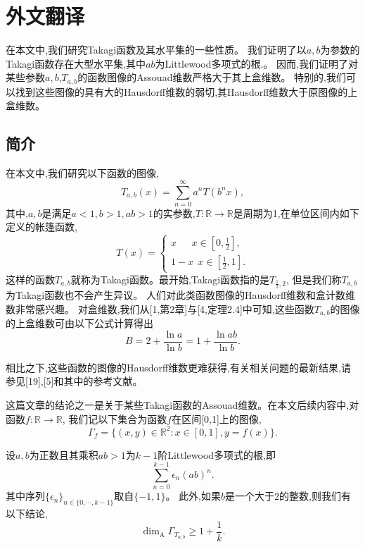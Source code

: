 \cleardoublepage

\newrefsection


\newtheorem{remark}[theorem]{评注}

\newtheorem{question}[theorem]{问题}

\newtheorem{theoremno}{定理}
\newcommand{\Hdim}{\mathrm{\dim_H}}
\newcommand{\Adim}{\mathrm{\dim_A}}
\newcommand{\Bdim}{\mathrm{\dim_B}}
\newcommand{\diam}{\mathrm{diam}}
\newcommand{\Hd}{\mathrm{d}_\mathcal{H}}
\chapter{外文翻译}


在本文中,我们研究Takagi函数及其水平集的一些性质。
我们证明了以$a,b$为参数的Takagi函数存在大型水平集,其中$ab$为Littlewood多项式的根.。
因而,我们证明了对某些参数$a,b$,$T_{a,b}$的函数图像的Assouad维数严格大于其上盒维数。
特别的,我们可以找到这些图像的具有大的Hausdorff维数的弱切,其Hausdorff维数大于原图像的上盒维数。

\section{简介}
在本文中,我们研究以下函数的图像,
$$
T_{a,b}(x)=\sum_{n=0}^\infty a^nT(b^nx),
$$
其中,$a,b$是满足$a<1,b>1,ab>1$的实参数,$T:\mathbb{R}\rightarrow\mathbb{R}$是周期为1,在单位区间内如下定义的帐篷函数,
$$
T(x)=\begin{cases}x~~~~~~~x\in[0,\frac{1}{2}], \\ 1-x~~x\in[\frac{1}{2},1].\end{cases}
$$
这样的函数$T_{a,b}$就称为Takagi函数。最开始,Takagi函数指的是$T_{\frac{1}{2},2}$,
但是我们称$T_{a,b}$为Takagi函数也不会产生异议。
人们对此类函数图像的Hausdorff维数和盒计数维数非常感兴趣。
对盒维数,我们从[1,第2章]与[4,定理2.4]中可知,这些函数$T_{a,b}$的图像的上盒维数可由以下公式计算得出
$$
B = 2 + \frac{\ln a}{\ln b} = 1 + \frac{\ln ab}{\ln b}.
$$

相比之下,这些函数的图像的Hausdorff维数更难获得,有关相关问题的最新结果,请参见[19],[5]和其中的参考文献。

这篇文章的结论之一是关于某些Takagi函数的Assouad维数。在本文后续内容中,对函数$f:\mathbb{R}\rightarrow\mathbb{R}$,
我们记以下集合为函数$f$在区间[0,1]上的图像,
$$
\Gamma_f=\{(x,y)\in\mathbb{R}^2:x\in[0,1],y=f(x)\}.
$$

\begin{theorem}[Assouad 维数]
      设$a,b$为正数且其乘积$ab>1$为$k-1$阶Littlewood多项式的根,即
      $$
      \sum_{n=0}^{k-1}\epsilon_n(ab)^n.
      $$
      其中序列$\{\epsilon_n\}_{n\in\{0,\cdots,k-1\}}$取自$\{-1,1\}$。
      此外,如果$b$是一个大于$2$的整数,则我们有以下结论,
      $$
      \Adim\Gamma_{T_{a,b}}\ge1+\frac{1}{k}.
      $$
\end{theorem}

